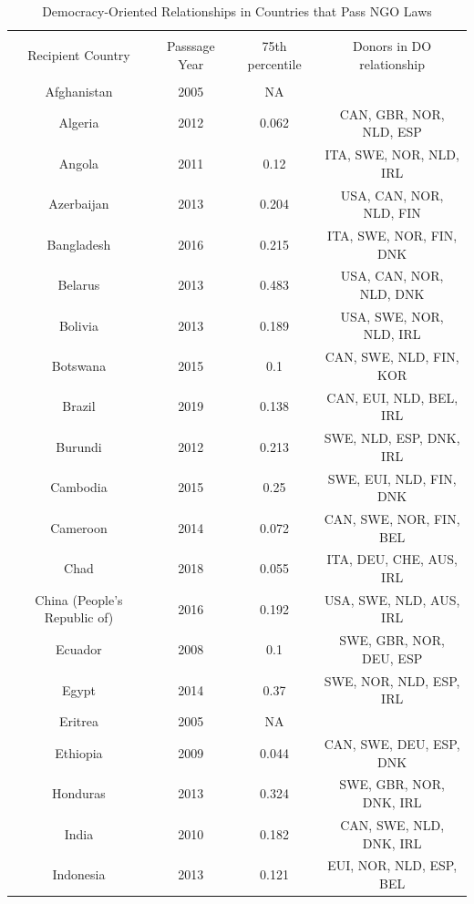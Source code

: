 
\begin{table}[!htbp] \centering 
  \caption{Democracy-Oriented Relationships in Countries that Pass NGO Laws} 
  \label{app:tab_relorient} 
\scriptsize 
\begin{tabular}{@{\extracolsep{3pt}} cccc} 
\\[-1.8ex]\hline 
\hline \\[-1.8ex] 
Recipient Country & Passsage Year & 75th percentile & Donors in DO relationship \\ 
\hline \\[-1.8ex] 
Afghanistan & 2005 & NA &  \\ 
Algeria & 2012 & 0.062 & CAN, GBR, NOR, NLD, ESP \\ 
Angola & 2011 & 0.12 & ITA, SWE, NOR, NLD, IRL \\ 
Azerbaijan & 2013 & 0.204 & USA, CAN, NOR, NLD, FIN \\ 
Bangladesh & 2016 & 0.215 & ITA, SWE, NOR, FIN, DNK \\ 
Belarus & 2013 & 0.483 & USA, CAN, NOR, NLD, DNK \\ 
Bolivia & 2013 & 0.189 & USA, SWE, NOR, NLD, IRL \\ 
Botswana & 2015 & 0.1 & CAN, SWE, NLD, FIN, KOR \\ 
Brazil & 2019 & 0.138 & CAN, EUI, NLD, BEL, IRL \\ 
Burundi & 2012 & 0.213 & SWE, NLD, ESP, DNK, IRL \\ 
Cambodia & 2015 & 0.25 & SWE, EUI, NLD, FIN, DNK \\ 
Cameroon & 2014 & 0.072 & CAN, SWE, NOR, FIN, BEL \\ 
Chad & 2018 & 0.055 & ITA, DEU, CHE, AUS, IRL \\ 
China (People's Republic of) & 2016 & 0.192 & USA, SWE, NLD, AUS, IRL \\ 
Ecuador & 2008 & 0.1 & SWE, GBR, NOR, DEU, ESP \\ 
Egypt & 2014 & 0.37 & SWE, NOR, NLD, ESP, IRL \\ 
Eritrea & 2005 & NA &  \\ 
Ethiopia & 2009 & 0.044 & CAN, SWE, DEU, ESP, DNK \\ 
Honduras & 2013 & 0.324 & SWE, GBR, NOR, DNK, IRL \\ 
India & 2010 & 0.182 & CAN, SWE, NLD, DNK, IRL \\ 
Indonesia & 2013 & 0.121 & EUI, NOR, NLD, ESP, BEL \\ 

\end{tabular}
\end{table}
